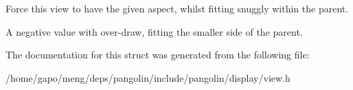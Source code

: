 Force this view to have the given aspect, whilst fitting snuggly within the parent. 

A negative value with \textquotesingle{}over-\/draw\textquotesingle{}, fitting the smaller side of the parent. 

The documentation for this struct was generated from the following file\+:\begin{DoxyCompactItemize}
\item 
/home/gapo/meng/deps/pangolin/include/pangolin/display/view.\+h\end{DoxyCompactItemize}

